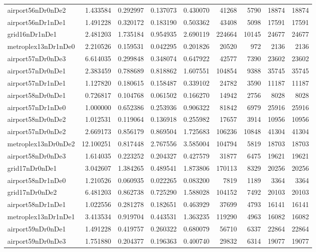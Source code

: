 \documentclass[../../../thesis.tex]{subfiles}
\begin{document}
\begin{longtable}{|l|r|r|r|r|r|r|r|r|}
airport56nDr0nDe2 & 1.433584 & 0.292997 & 0.137073 & 0.430070 & 41268 & 5790 & 18874 & 18874 \\
airport56nDr1nDe1 & 1.491228 & 0.320172 & 0.183190 & 0.503362 & 43408 & 5098 & 17591 & 17591 \\
grid16nDr1nDe1 & 2.481203 & 1.735184 & 0.954935 & 2.690119 & 224664 & 10145 & 24677 & 24677 \\
metroplex13nDr1nDe0 & 2.210526 & 0.159531 & 0.042295 & 0.201826 & 20520 & 972 & 2136 & 2136 \\
airport57nDr0nDe3 & 6.614035 & 0.299848 & 0.348074 & 0.647922 & 42577 & 7390 & 23602 & 23602 \\
airport57nDr0nDe1 & 2.383459 & 0.788689 & 0.818862 & 1.607551 & 104854 & 9388 & 35745 & 35745 \\
airport57nDr1nDe1 & 1.127820 & 0.180615 & 0.158487 & 0.339102 & 24782 & 3590 & 11187 & 11187 \\
airport58nDr0nDe1 & 0.726817 & 0.104768 & 0.061502 & 0.166270 & 14942 & 2756 & 8028 & 8028 \\
airport57nDr1nDe0 & 1.000000 & 0.652386 & 0.253936 & 0.906322 & 81842 & 6979 & 25916 & 25916 \\
airport58nDr0nDe2 & 1.012531 & 0.119064 & 0.136918 & 0.255982 & 17657 & 3914 & 10956 & 10956 \\
airport57nDr0nDe2 & 2.669173 & 0.856179 & 0.869504 & 1.725683 & 106236 & 10848 & 41304 & 41304 \\
metroplex13nDr0nDe2 & 12.100251 & 0.817448 & 2.767556 & 3.585004 & 104794 & 5819 & 18703 & 18703 \\
airport58nDr0nDe3 & 1.614035 & 0.223252 & 0.204327 & 0.427579 & 31877 & 6475 & 19621 & 19621 \\
grid17nDr0nDe1 & 3.042607 & 1.384265 & 0.489541 & 1.873806 & 170113 & 8329 & 20256 & 20256 \\
airport58nDr1nDe0 & 1.210526 & 0.060935 & 0.022265 & 0.083200 & 7819 & 1189 & 3364 & 3364 \\
grid17nDr0nDe2 & 6.481203 & 0.862738 & 0.725290 & 1.588028 & 104152 & 7492 & 20103 & 20103 \\
airport58nDr1nDe1 & 1.022556 & 0.281278 & 0.182651 & 0.463929 & 37699 & 4793 & 16141 & 16141 \\
metroplex13nDr1nDe1 & 3.413534 & 0.919704 & 0.443531 & 1.363235 & 119290 & 4963 & 16082 & 16082 \\
airport59nDr0nDe1 & 1.491228 & 0.419757 & 0.260322 & 0.680079 & 56710 & 6337 & 22864 & 22864 \\
airport59nDr0nDe3 & 1.751880 & 0.204377 & 0.196363 & 0.400740 & 29832 & 6314 & 19077 & 19077 \\

\end{longtable}
\end{document}
